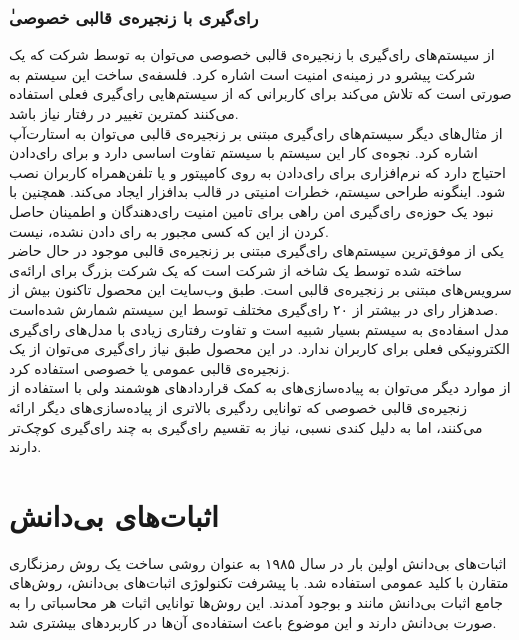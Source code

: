 \subsubsection{ٰرای‌گیری با زنجیره‌ی قالبی خصوصی}
از سیستم‌های رای‌گیری با زنجیره‌ی قالبی خصوصی می‌توان به 
\cite{votebook}
توسط شرکت 
که یک شرکت پیشرو در زمینه‌ی امنیت است اشاره کرد. فلسفه‌ی ساخت این سیستم به صورتی است که تلاش می‌کند برای کاربرانی که از سیستم‌هایی رای‌گیری فعلی استفاده می‌کنند کمترین تغییر در رفتار نیاز باشد. 
\\
از مثال‌های دیگر سیستم‌های رای‌گیری مبتنی بر زنجیره‌ی قالبی می‌توان به استارت‌آپ 
اشاره کرد. نجوه‌ی کار این سیستم با سیستم 
تفاوت اساسی دارد و برای رای‌دادن احتیاج دارد که نرم‌‌افزاری برای رای‌دادن به روی کامپیتور و یا تلفن‌همراه کاربران نصب شود. اینگونه طراحی سیستم،‌ خطرات امنیتی در قالب بدافزار ایجاد می‌کند. همچنین با نبود یک حوزه‌ی رای‌گیری امن راهی برای تامین امنیت رای‌دهندگان و اطمینان حاصل کردن از این که کسی مجبور به رای‌ دادن نشده، نیست.
\\
یکی از موفق‌ترین سیستم‌های رای‌گیری مبتنی بر زنجیره‌ی قالبی موجود در حال حاضر 
ساخته شده توسط یک شاخه از شرکت 
است که یک شرکت بزرگ برای ارائه‌ی سرویس‌های مبتنی بر زنجیره‌ی قالبی است. طبق وب‌سایت این محصول تاکنون بیش از صدهزار رای در بیشتر از ۲۰ رای‌گیری مختلف توسط این سیستم‌ شمارش شده‌است. 
\\
مدل اسفاده‌ی 
به سیستم‌ 
بسیار شبیه است و تفاوت رفتاری زیادی با مدل‌های رای‌گیری الکترونیکی فعلی برای کاربران ندارد. در این محصول طبق نیاز رای‌گیری می‌توان از یک زنجیره‌ی قالبی عمومی یا خصوصی استفاده کرد.
\\
از موارد دیگر می‌توان به پیاده‌سازی‌های به کمک قرارداد‌های هوشمند ولی با استفاده از زنجیره‌ی قالبی خصوصی 
\cite{privblock}
که توانایی ردگیری بالاتری از پیاده‌سازی‌های دیگر ارائه می‌کنند، اما به دلیل کندی نسبی، نیاز به تقسیم رای‌گیری به چند رای‌گیری کوچک‌تر دارند.

\section{اثبات‌های بی‌دانش}
اثبات‌های بی‌دانش اولین بار در سال ۱۹۸۵ 
\cite{GHY}
به عنوان روشی ساخت یک روش رمزنگاری متقارن با کلید عمومی استفاده شد. با پیشرفت تکنولوژی اثبات‌های بی‌دانش،‌ روش‌های جامع اثبات بی‌دانش مانند
\cite{zksnark}
و  
\cite{zkstark}
بوجود آمدند. این روش‌ها توانایی اثبات هر محاسباتی را به صورت بی‌دانش دارند و این موضوع باعث استفاده‌ی آن‌ها در کاربردهای بیشتری شد.
